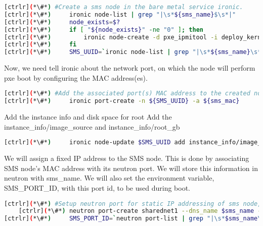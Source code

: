 
\begin{lstlisting}[language=bash,keywords={}]
[ctrlr](*\#*) #Create a sms node in the bare metal service ironic.
[ctrlr](*\#*)     ironic node-list | grep "|\s*${sms_name}$\s*|"
[ctrlr](*\#*)     node_exists=$?
[ctrlr](*\#*)     if [ "${node_exists}" -ne "0" ]; then 
[ctrlr](*\#*)         ironic node-create -d pxe_ipmitool -i deploy_kernel=${DEPLOY_VMLINUZ_UUID} -i deploy_ramdisk=${DEPLOY_INITRD_UUID} -i ipmi_terminal_port=8023 -i ipmi_address=${sms_bmc} -i ipmi_username=${sms_bmc_username} -i ipmi_password=${sms_bmc_password} -p cpus=${CPU} -p memory_mb=${RAM_MB} -p local_gb=${DISK_GB} -p cpu_arch=${ARCH} -p capabilities="boot_mode:bios" -n ${sms_name}
[ctrlr](*\#*)     fi
[ctrlr](*\#*)     SMS_UUID=`ironic node-list | grep "|\s*${sms_name}\s*|" | awk '{print $2}'`
\end{lstlisting} 

	Now, we need tell ironic about the network port, on which the node will perform pxe boot by configuring the MAC address(es). 



\begin{lstlisting}[language=bash,keywords={}]
[ctrlr](*\#*) #Add the associated port(s) MAC address to the created node(s)
[ctrlr](*\#*)     ironic port-create -n ${SMS_UUID} -a ${sms_mac}
\end{lstlisting} 

	Add the instance info and disk space for root 
	Add the instance\_info/image\_source and instance\_info/root\_gb
    

\begin{lstlisting}[language=bash,keywords={}]
[ctrlr](*\#*)     ironic node-update $SMS_UUID add instance_info/image_source=${SMS_DISK_IMAGE_UUID} instance_info/root_gb=50
\end{lstlisting} 


	We will assign a fixed IP address to the SMS node. This is done by associating SMS node’s MAC address with its neutron port. We will store this information in neutron with sms\_name. We will also set the environment variable, SMS\_PORT\_ID, with this port id, to be used during boot.

    
    \begin{lstlisting}[language=bash,keywords={}]
    [ctrlr](*\#*) #Setup neutron port for static IP addressing of sms node, this is an optional part
    [ctrlr](*\#*) neutron port-create sharednet1 --dns_name $sms_name --fixed-ip ip_address=$sms_ip --name $sms_name --mac-address $sms_mac
[ctrlr](*\#*)     SMS_PORT_ID=`neutron port-list | grep "|\s*$sms_name\s*|" | awk '{print $2}'`
	\end{lstlisting} 


